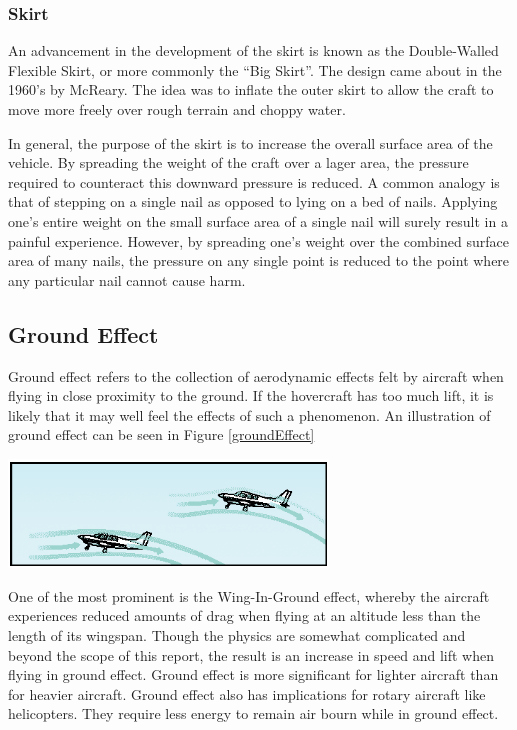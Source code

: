 \subsubsection{Skirt}
An advancement in the development of the skirt is known as the Double-Walled Flexible Skirt, or more commonly the “Big Skirt”. The design came about in the 1960’s by McReary. The idea was to inflate the outer skirt to allow the craft to move more freely over rough terrain and choppy water.

In general, the purpose of the skirt is to increase the overall surface area of the vehicle. By spreading the weight of the craft over a lager area, the pressure required to counteract this downward pressure is reduced. A common analogy is that of stepping on a single nail as opposed to lying on a bed of nails. Applying one’s entire weight on the small surface area of a single nail will surely result in a painful experience. However, by spreading one’s weight over the combined surface area of many nails, the pressure on any single point is reduced to the point where any particular nail cannot cause harm.

\subsection{Ground Effect}
Ground effect refers to the collection of aerodynamic effects felt by aircraft when flying in close proximity to the ground. If the hovercraft has too much lift, it is likely that it may well feel the effects of such a phenomenon.  An illustration of ground effect can be seen in Figure \ref{groundEffect}


  \begin{center}
    \includegraphics[width=85mm]{imageSources/groundEffect.png}
  \end{center}
  \label{groundEffect}

One of the most prominent is the Wing-In-Ground effect, whereby the aircraft experiences reduced amounts of drag when flying at an altitude less than the length of its wingspan. Though the physics are somewhat complicated and beyond the scope of this report, the result is an increase in speed and lift when flying in ground effect. Ground effect is more significant for lighter aircraft than for heavier aircraft. Ground effect also has implications for rotary aircraft like helicopters. They require less energy to remain air bourn while in ground effect.

